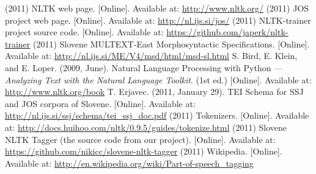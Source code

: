 \documentclass[10pt, conference, compsocconf]{IEEEtran}
\begin{document}
\begin{thebibliography}{99}
 (2011) NLTK web page. [Online]. Available at: \url{http://www.nltk.org/}
 (2011) JOS project web page. [Online]. Available at: \url{http://nl.ijs.si/jos/}
 (2011) NLTK-trainer project source code. [Online]. Available at: \url{https://github.com/japerk/nltk-trainer}
 (2011) Slovene MULTEXT-East Morphosyntactic Specifications. [Online]. Available at: \url{http://nl.ijs.si/ME/V4/msd/html/msd-sl.html}
 S. Bird, E. Klein, and E. Loper. (2009, June). Natural Language Processing with Python \textit{--- Analyzing Text with the Natural Language Toolkit}. (1st ed.) [Online]. Available at: \url{http://www.nltk.org/book}
 T. Erjavec. (2011, January 29). TEI Schema for SSJ and JOS corpora of Slovene. [Online].
Available at: \url{http://nl.ijs.si/ssj/schema/tei_ssj_doc.pdf}
 (2011) Tokenizers. [Online]. Available at: \url{http://docs.huihoo.com/nltk/0.9.5/guides/tokenize.html}
 (2011) Slovene NLTK Tagger (the source code from our project). [Online]. Available at: \url{https://github.com/nikicc/slovene-nltk-tagger}
 (2011) Wikipedia. [Online]. Available at: \url{http://en.wikipedia.org/wiki/Part-of-speech_tagging}
\end{thebibliography}
\end{document}
